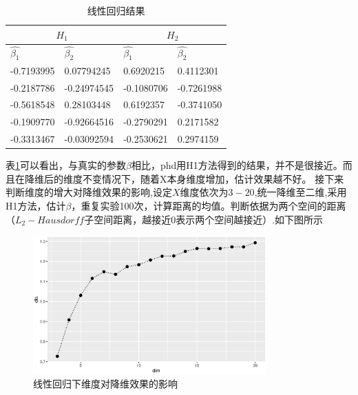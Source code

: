 \begin{table}[htbp]
\centering
\caption{线性回归结果}
\label{tab:norm}
\begin{tabular}{l|l|ll}
\hline
\multicolumn{2}{c|}{$H_1$} & \multicolumn{2}{c}{$H_2$}                    \\ \hline
$\hat{\beta_{1}}$&$\hat{\beta_{2}}$& \multicolumn{1}{l|}{$\hat{\beta_{1}}$}  &$\hat{\beta_{2}}$ \\ \hline
-0.7193995  & 0.07794245   & \multicolumn{1}{l|}{0.6920215}  & 0.4112301  \\ \hline
-0.2187786  & -0.24974545  & \multicolumn{1}{l|}{-0.1080706} & -0.7261988 \\ \hline
-0.5618548  & 0.28103448   & \multicolumn{1}{l|}{0.6192357}  & -0.3741050 \\ \hline
-0.1909770  & -0.92664516  & \multicolumn{1}{l|}{-0.2790291} & 0.2171582  \\ \hline
-0.3313467  & -0.03092594  & \multicolumn{1}{l|}{-0.2530621} & 0.2974159  \\ \hline
\end{tabular}
\end{table}
表\ref{tab:norm}可以看出，与真实的参数$\beta$相比，phd用H1方法得到的结果，并不是很接近。而且在降维后的维度不变情况下，随着X本身维度增加，估计效果越不好。
接下来判断维度的增大对降维效果的影响,设定$X$维度依次为$3-20$,统一降维至二维,采用H1方法，估计$\beta$，重复实验100次，计算距离的均值。判断依据为两个空间的距离（$L_2-Hausdorff$子空间距离，越接近0表示两个空间越接近）.如下图所示
\begin{figure}[H]
    \centering
    \includegraphics[width=0.8\textwidth]{image/norm_phd.eps} 
    \caption{线性回归下维度对降维效果的影响}
\end{figure}


